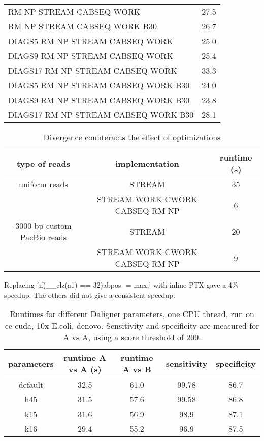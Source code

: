 \documentclass[../main/thesis.tex]{subfiles}
\begin{document}
\begin{table}
\begin{tabular}{l c}
RM NP STREAM CABSEQ WORK & 27.5 \\
RM NP STREAM CABSEQ WORK B30 & 26.7 \\
DIAGS5 RM NP STREAM CABSEQ WORK & 25.0 \\
DIAGS9 RM NP STREAM CABSEQ WORK & 25.4 \\
DIAGS17 RM NP STREAM CABSEQ WORK & 33.3 \\
DIAGS5 RM NP STREAM CABSEQ WORK B30 & 24.0 \\
DIAGS9 RM NP STREAM CABSEQ WORK B30 & 23.8 \\
DIAGS17 RM NP STREAM CABSEQ WORK B30 & 28.1 \\
\end{tabular}
\end{table}

\begin{table}
\centering
\caption{Divergence counteracts the effect of optimizations}
\label{tbl:daligner2}
\begin{tabular}{c|c|c}
type of reads & implementation & runtime (s) \\ \hline
uniform reads & STREAM & 35 \\
& STREAM WORK CWORK CABSEQ RM NP & 6 \\ \hline
3000 bp custom PacBio reads & STREAM & 20 \\
& STREAM WORK CWORK CABSEQ RM NP & 9 \\
\end{tabular}
\end{table}


Replacing 'if(\_\_clz(a1) == 32){abpos -= max;}' with inline PTX gave a 4\% speedup.
The others did not give a consistent speedup.



\begin{table}
\centering
\caption{Runtimes for different Daligner parameters, one CPU thread, run on ce-cuda, 10x E.coli, denovo. Sensitivity and specificity are measured for A vs A, using a score threshold of 200.}
\begin{tabular}{c|cccc}
parameters & runtime A vs A (s) & runtime A vs B & sensitivity & specificity \\ \hline
default & 32.5 & 61.0 & 99.78 & 86.7 \\
h45  & 31.5 & 57.6 & 99.58 & 86.8 \\
k15  & 31.6 & 56.9 & 98.9 & 87.1 \\
k16  & 29.4 & 55.2 & 96.9 & 87.5 \\
\end{tabular}
\label{tbl:daligner3}
\end{table}
\end{document}
